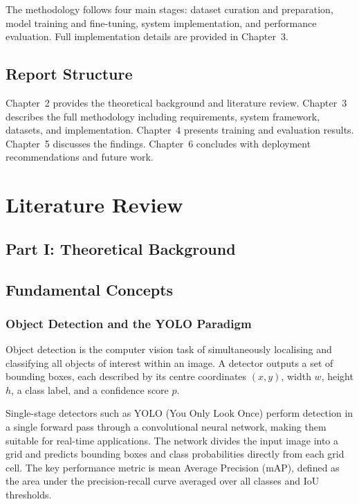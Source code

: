 \documentclass[12pt,a4paper]{report}
\begin{document}
The methodology follows four main stages: dataset curation and preparation,
model training and fine-tuning, system implementation, and performance
evaluation. Full implementation details are provided in Chapter~3.

\section{Report Structure}

Chapter~2 provides the theoretical background and literature review.
Chapter~3 describes the full methodology including requirements, system
framework, datasets, and implementation. Chapter~4 presents training and
evaluation results. Chapter~5 discusses the findings. Chapter~6 concludes
with deployment recommendations and future work.

\chapter{Literature Review}

\section*{Part I: Theoretical Background}

\section{Fundamental Concepts}

\subsection{Object Detection and the YOLO Paradigm}

Object detection is the computer vision task of simultaneously localising
and classifying all objects of interest within an image. A detector outputs
a set of bounding boxes, each described by its centre coordinates $(x, y)$,
width $w$, height $h$, a class label, and a confidence score $p$.

Single-stage detectors such as YOLO (You Only Look Once) perform detection
in a single forward pass through a convolutional neural network, making them
suitable for real-time applications. The network divides the input image into
a grid and predicts bounding boxes and class probabilities directly from each
grid cell. The key performance metric is mean Average Precision (mAP), defined
as the area under the precision-recall curve averaged over all classes and
IoU thresholds.
\end{document}
